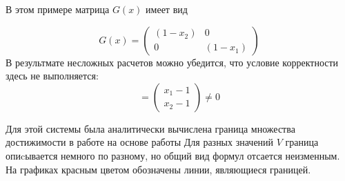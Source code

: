 В этом примере матрица $G(x)$ имеет вид 

\begin{equation*}
  G(x) = 
  \begin{pmatrix}
    (1-x_2) & 0 \\
    0 & (1-x_1)
  \end{pmatrix}
\end{equation*}
В результмате несложных расчетов можно убедится, что условие корректности здесь не выполняется:
\begin{equation*}
  [\varphi,\psi] = 
  \begin{pmatrix}
    x_1 - 1\\
    x_2 - 1
  \end{pmatrix}
  \neq 0
\end{equation*}


Для этой системы была аналитически вычислена граница множества
достижимости в работе на основе работы \cite{AVS2016} Для разных
значений $V$ граница опиcывается немного по разному, но общий вид
формул отсается неизменным. На графиках красным цветом обозначены
линии, являющиеся границей.

